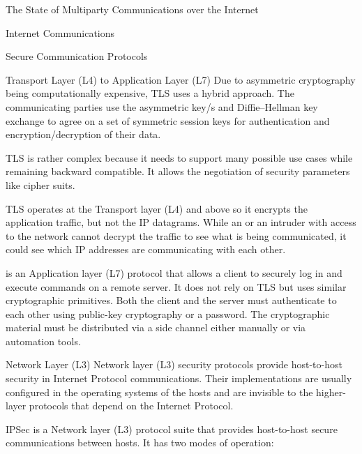 \begin{frame}[fragile]{The State of Multiparty Communications over the
Internet}
\begin{block}{Internet Communications}
\begin{block}{Secure Communication Protocols}
\begin{block}{Transport Layer (L4) to Application Layer (L7)}
Due to asymmetric cryptography being computationally expensive, TLS uses
a hybrid approach. The communicating parties use the asymmetric key/s
and Diffie--Hellman key exchange to agree on a set of symmetric session
keys for authentication and encryption/decryption of their data.

TLS is rather complex because it needs to support many possible use
cases while remaining backward compatible. It allows the negotiation of
security parameters like cipher suits.

TLS operates at the Transport layer (L4) and above so it encrypts the
application traffic, but not the IP datagrams. While an  or an
intruder with access to the network cannot decrypt the traffic to see
what is being communicated, it could see which IP addresses are
communicating with each other.

 is an Application layer (L7) protocol that allows a client to
securely log in and execute commands on a remote server. It does not
rely on TLS but uses similar cryptographic primitives. Both the client
and the server must authenticate to each other using public-key
cryptography or a password. The cryptographic material must be
distributed via a side channel either manually or via automation tools.
\end{block}

\begin{block}{Network Layer (L3)}
\protect\hypertarget{network-layer-l3-1}{}
Network layer (L3) security protocols provide host-to-host security in
Internet Protocol communications. Their implementations are usually
configured in the operating systems of the hosts and are invisible to
the higher-layer protocols that depend on the Internet Protocol.

\begin{block}{IPSec}
\protect\hypertarget{ipsec}{}
 is a Network layer (L3) protocol suite that provides
host-to-host secure communications between  hosts. It has two
modes of operation:


\end{block}
\end{block}
\end{block}
\end{block}
\end{frame}
